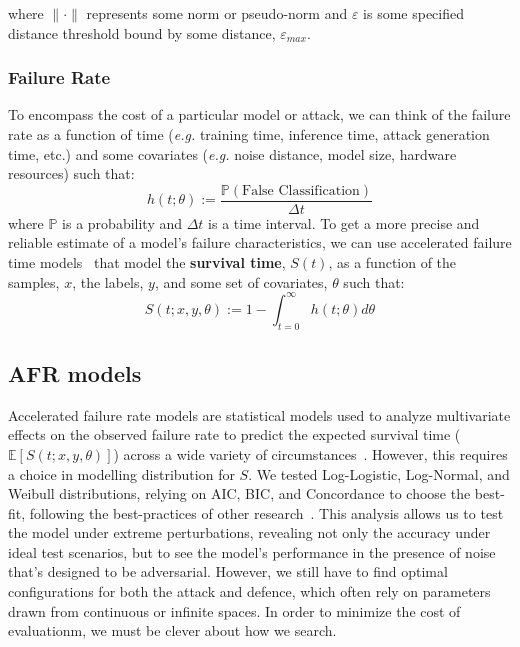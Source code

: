 \documentclass[conference]{IEEEtran}
\begin{document}
where $\| \cdot \|$ represents some norm or pseudo-norm and $\varepsilon$ is some specified distance threshold bound by some distance, $\varepsilon_{max}$.


\subsubsection{Failure Rate}
 To encompass the cost of a particular model or attack, we can think of the failure rate as a function of time (\textit{e.g.} training time, inference time, attack generation time, etc.) and some covariates (\textit{e.g.} noise distance, model size, hardware resources) such that:
\[
h(t; \theta) :=  \frac{\mathbb{P}(\textrm{False~Classification})}{\Delta t}
\]
where $\mathbb{P}$ is a probability and $\Delta t$ is a time interval. To get a more precise and reliable estimate of a model's failure characteristics, we can use accelerated failure time models~\cite{meyers_aft} that model the \textbf{survival time}, $S(t)$, as a function of the samples, $x$, the labels, $y$, and some set of covariates, $\theta$ such that:
\[
S(t; x,y, \theta) := 1 - \int_{t=0}^{\infty} h(t;\theta) d \theta
\]

\subsection{AFR models}
\label{afr}
Accelerated failure rate models are statistical models used to analyze multivariate effects on the observed failure rate to predict the expected survival time ($\mathbb{E}[S(t; x,y, \theta)]$) across a wide variety of circumstances~\cite{aft_models,meyers_aft}. However, this requires a choice in modelling distribution for $S$. We tested Log-Logistic, Log-Normal, and Weibull distributions, relying on AIC, BIC, and Concordance to choose the best-fit, following the best-practices of other research~\cite{aft_models,meyers_aft}.  This analysis allows us to test the model under extreme perturbations, revealing not only the accuracy under ideal test scenarios, but to see the model's performance in the presence of noise that's designed to be adversarial. However, we still have to find optimal configurations for both the attack and defence, which often rely on parameters drawn from continuous or infinite spaces. In order to minimize the cost of evaluationm, we must be clever about how we search.
\end{document}

